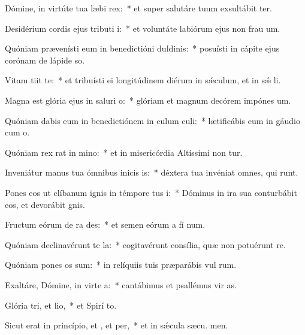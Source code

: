 \item Dómine, in virtúte tua læbi rex:~* et super salutáre tuum exsultábit ter.
\item Desidérium cordis ejus tributi i:~* et voluntáte labiórum ejus non frau um.
\item Quóniam prævenísti eum in benedictióni duldinis:~* posuísti in cápite ejus corónam de lápide so.
\item Vitam tiit  te:~* et tribuísti ei longitúdinem diérum in sǽculum, et in sǽ li.
\item Magna est glória ejus in saluri o:~* glóriam et magnum decórem impónes  um.
\item Quóniam dabis eum in benedictiónem in culum culi:~* lætificábis eum in gáudio cum  o.
\item Quóniam rex rat in mino:~* et in misericórdia Altíssimi non tur.
\item Inveniátur manus tua ómnibus inicis is:~* déxtera tua invéniat omnes, qui  runt.
\item Pones eos ut clíbanum ignis in témpore tus i:~* Dóminus in ira sua conturbábit eos, et devorábit  gnis.
\item Fructum eórum de ra des:~* et semen eórum a fí num.
\item Quóniam declinavérunt  te la:~* cogitavérunt consília, quæ non potuérunt re.
\item Quóniam pones os sum:~* in relíquiis tuis præparábis vul rum.
\item Exaltáre, Dómine, in virte a:~* cantábimus et psallémus vir as.
\item Glória tri, et lio,~* et Spirí to.
\item Sicut erat in princípio, et , et per,~* et in sǽcula sæcu. men.
